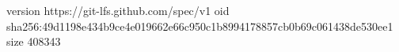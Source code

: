 version https://git-lfs.github.com/spec/v1
oid sha256:49d1198e434b9ce4e019662e66c950c1b8994178857cb0b69c061438de530ee1
size 408343
